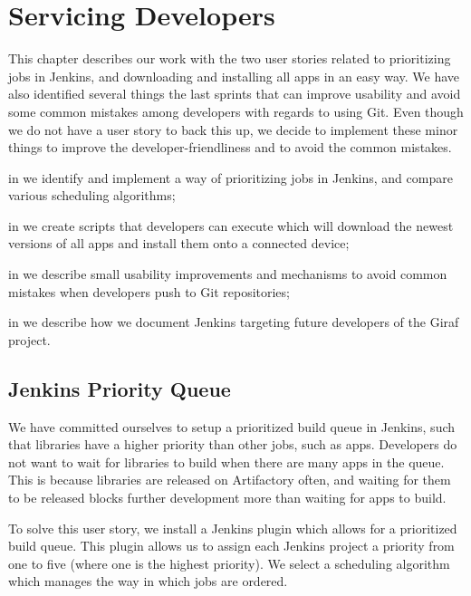 \chapter{Servicing Developers}
This chapter describes our work with the two user stories related to prioritizing jobs in Jenkins, and downloading and installing all apps in an easy way. We have also identified several things the last sprints that can improve usability and avoid some common mistakes among developers with regards to using Git. Even though we do not have a user story to back this up, we decide to implement these minor things to improve the developer-friendliness and to avoid the common mistakes.

\begin{chapterorganization}
  \item in  we identify and implement a way of prioritizing jobs in Jenkins, and compare various scheduling algorithms;
  \item in  we create scripts that developers can execute which will download the newest versions of all apps and install them onto a connected device;
  \item in  we describe small usability improvements and mechanisms to avoid common mistakes when developers push to Git repositories;
  \item in  we describe how we document Jenkins targeting future developers of the Giraf project.
\end{chapterorganization}

\section{Jenkins Priority Queue}\label{sec:jenkins_prio_queue}
We have committed ourselves to setup a prioritized build queue in Jenkins, such that libraries have a higher priority than other jobs, such as apps. Developers do not want to wait for libraries to build when there are many apps in the queue. This is because libraries are released on Artifactory often, and waiting for them to be released blocks further development more than waiting for apps to build.

To solve this user story, we install a Jenkins plugin \parencite{jenkins-priority-plugin} which allows for a prioritized build queue. This plugin allows us to assign each Jenkins project a priority from one to five (where one is the highest priority). We select a scheduling algorithm which manages the way in which jobs are ordered.

